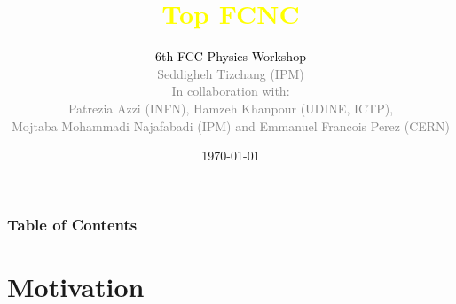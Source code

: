 \documentclass[xcolor=dvipsnames,8pt]{beamer}
\title[Top FCNC]{\LARGE\textcolor{yellow}{Top FCNC}}
\author[]{\textcolor{black}{ 6th FCC Physics Workshop} \\
	\vspace{0.5cm}
	\centering
     \textcolor{Gray}{Seddigheh Tizchang (IPM)}\\
     \vspace{0.2cm}
               \textcolor{gray}{In collaboration with:}\\
	\textcolor{Gray}{Patrezia Azzi (INFN), Hamzeh Khanpour (UDINE, ICTP),\\ Mojtaba Mohammadi Najafabadi (IPM)
 and Emmanuel Francois Perez (CERN)}
}
\date{\today}
\begin{document}
\section{}
\begin{frame}
	\titlepage %
 
\end{frame}


\begin{frame}
	\frametitle{Table of Contents} %
	
	\tableofcontents %
\end{frame}

\section{Motivation} %
\end{document}
